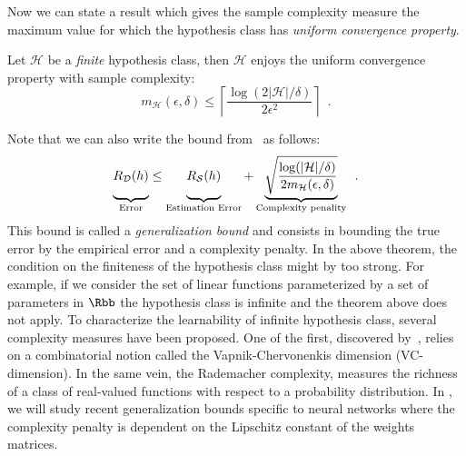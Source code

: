 Now we can state a result which gives the sample complexity measure the maximum value for which the hypothesis class has \emph{uniform convergence property}.
\begin{theorem} \label{theorem:ch2-sample_complexity_bound}
  Let $\mathcal{H}$ be a \emph{finite} hypothesis class, then $\mathcal{H}$ enjoys the uniform convergence property with sample complexity:
  \begin{equation}
      m_\mathcal{H}(\epsilon, \delta) \leq \left\lceil \frac{\log(2 |\mathcal{H}|	/ \delta)}{2 \epsilon^2} \right\rceil \enspace.
  \end{equation}
  \removespace
\end{theorem}
\noindent
Note that we can also write the bound from~ as follows:
\begin{equation}
  \underbrace{\vphantom{\sqrt{\frac{\log(|\mathcal{H}|/\delta)}{2 m_\mathcal{H}(\epsilon, \delta)}}} R_\mathcal{D}(h)}_{\text{Error}} \leq \underbrace{\vphantom{\sqrt{\frac{\log(|\mathcal{H}|/\delta)}{2 m_\mathcal{H}(\epsilon, \delta)}}} R_\mathcal{S}(h)}_{\text{Estimation Error}} + \underbrace{\sqrt{\frac{\log(|\mathcal{H}|/\delta)}{2 m_\mathcal{H}(\epsilon, \delta)}}}_{\text{Complexity penality}} \enspace.
\end{equation}
This bound is called a \emph{generalization bound} and consists in bounding the true error by the empirical error and a complexity penalty. 
In the above theorem, the condition on the finiteness of the hypothesis class might by too strong.
For example, if we consider the set of linear functions parameterized by a set of parameters in $\Rbb$ the hypothesis class is infinite and the theorem above does not apply.
To characterize the learnability of infinite hypothesis class, several complexity measures have been proposed.
One of the first, discovered by~\citet{vapnik2015uniform}, relies on a combinatorial notion called the Vapnik-Chervonenkis dimension (VC-dimension).
In the same vein, the Rademacher complexity, measures the richness of a class of real-valued functions with respect to a probability distribution.
In , we will study recent generalization bounds specific to neural networks where the complexity penalty is dependent on the Lipschitz constant of the weights matrices.


